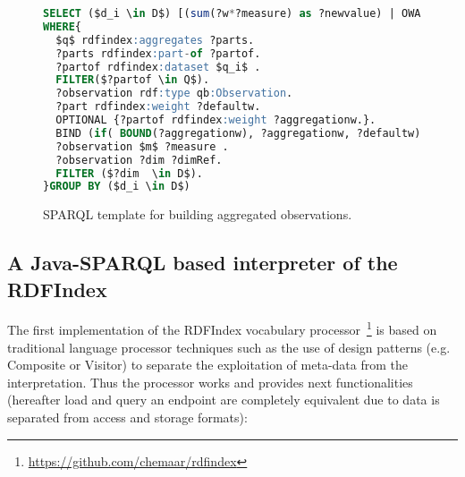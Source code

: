 \begin{figure}[!ht]
\begin{lstlisting}[language=SQL,mathescape]  
SELECT ($d_i \in D$) [(sum(?w*?measure) as ?newvalue) | OWA(?measure)]
WHERE{
  $q$ rdfindex:aggregates ?parts.
  ?parts rdfindex:part-of ?partof.
  ?partof rdfindex:dataset $q_i$ .
  FILTER($?partof \in Q$).  
  ?observation rdf:type qb:Observation.
  ?part rdfindex:weight ?defaultw.     
  OPTIONAL {?partof rdfindex:weight ?aggregationw.}.
  BIND (if( BOUND(?aggregationw), ?aggregationw, ?defaultw) AS ?w)
  ?observation $m$ ?measure . 
  ?observation ?dim ?dimRef. 
  FILTER ($?dim  \in D$).
}GROUP BY ($d_i \in D$)
\end{lstlisting}
\caption{SPARQL template for building aggregated observations.}
 \label{fig:results-rdf-sparql-template}
\end{figure}


\subsection{A Java-SPARQL based interpreter of the RDFIndex}
The first implementation of the RDFIndex vocabulary processor~\footnote{\url{https://github.com/chemaar/rdfindex}} is based on traditional 
language processor techniques such as the use of design patterns (e.g. Composite or Visitor) 
to separate the exploitation of meta-data from the interpretation. Thus the processor 
works and provides next functionalities (hereafter load and query an endpoint are completely equivalent due to 
data is separated from access and storage formats):

